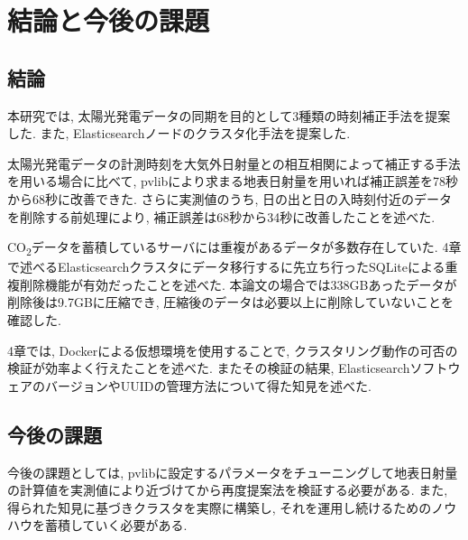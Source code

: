 \chapter{結論と今後の課題}
\label{chap:fifth}

\section{結論}
本研究では, 太陽光発電データの同期を目的として3種類の時刻補正手法を提案した. また, Elasticsearchノードのクラスタ化手法を提案した.

太陽光発電データの計測時刻を大気外日射量との相互相関によって補正する手法を用いる場合に比べて, pvlibにより求まる地表日射量を用いれば補正誤差を78秒から68秒に改善できた. さらに実測値のうち, 日の出と日の入時刻付近のデータを削除する前処理により, 補正誤差は68秒から34秒に改善したことを述べた. 

CO\textsubscript{2}データを蓄積しているサーバには重複があるデータが多数存在していた. 4章で述べるElasticsearchクラスタにデータ移行するに先立ち行ったSQLiteによる重複削除機能が有効だったことを述べた. 本論文の場合では338GBあったデータが削除後は9.7GBに圧縮でき, 圧縮後のデータは必要以上に削除していないことを確認した.

4章では, Dockerによる仮想環境を使用することで, クラスタリング動作の可否の検証が効率よく行えたことを述べた. またその検証の結果, ElasticsearchソフトウェアのバージョンやUUIDの管理方法について得た知見を述べた.

\section{今後の課題}

今後の課題としては, pvlibに設定するパラメータをチューニングして地表日射量の計算値を実測値により近づけてから再度提案法を検証する必要がある. また, 得られた知見に基づきクラスタを実際に構築し, それを運用し続けるためのノウハウを蓄積していく必要がある.

